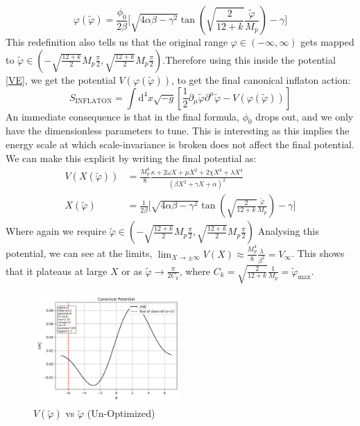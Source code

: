 \documentclass[aps,prd,reprint,preprintnumbers,showpacs,floatfix,nofootinbib,superscript address]{revtex4-2}
\begin{document}
\begin{equation}
    \varphi(\tilde{\varphi}) = \frac{\phi_0}{2\beta} \Biggl[ \sqrt{4\alpha\beta - \gamma^2} \tan\left(\sqrt{\frac{2}{12+k}}\frac{\tilde{\varphi}}{M_p}\right) - \gamma \Biggr] 
\end{equation}
This redefinition also tells us that the original range $\varphi \in (-\infty,\infty)$ gets mapped to $\tilde{\varphi} \in \left( -\sqrt{\frac{12 + k}{2}}M_p \frac{\pi}{2},\sqrt{\frac{12 + k}{2}}M_p \frac{\pi}{2} \right)$.Therefore using this inside the potential \ref{VE}, we get the potential $V(\varphi(\tilde{\varphi}))$, to get the final canonical inflaton action:
\begin{equation}
    S_{\text{INFLATON}} = \int \text{d}^4x \sqrt{-g} \left[ \frac{1}{2}\partial_\mu \tilde{\varphi}\partial^\mu \tilde{\varphi} - V(\varphi(\tilde{\varphi})) \right]
\end{equation}
An immediate consequence is that in the final formula, $\phi_0$ drops out, and we only have the dimensionless parameters to tune. This is interesting as this implies the energy scale at which scale-invariance is broken does not affect the final potential. We can make this explicit by writing the final potential as:
\begin{align}
    V(X(\tilde{\varphi})) &=  \frac{M_p^4}{8}  \frac{ \kappa + 2\omega X +\mu X^2 + 2\chi X^3 + \lambda X^4 }{(\beta X^2 + \gamma X + \alpha )^2} \label{Potential} \\
    X(\tilde{\varphi}) &= \frac{1}{2\beta} \Biggl[ \sqrt{4\alpha\beta - \gamma^2} \tan\left(\sqrt{\frac{2}{12+k}}\frac{\tilde{\varphi}}{M_p}\right) - \gamma \Biggr]  \label{X}
\end{align}
Where again we require $\tilde{\varphi} \in \left( -\sqrt{\frac{12 + k}{2}}M_p \frac{\pi}{2},\sqrt{\frac{12 + k}{2}}M_p \frac{\pi}{2} \right)$
Analysing this potential, we can see at the limits, $\lim_{X \rightarrow \pm \infty} V(X) \approx \frac{M_p^4}{8} \frac{\lambda}{\beta^2} = V_\infty$. This shows that it plateaus at large $X$ or as $\tilde{\varphi} \rightarrow \frac{\pi}{2 C_k}$, where $C_k = \sqrt{\frac{2}{12+k}} \frac{1}{M_p} = \tilde{\varphi}_\text{max}$.

\begin{figure}[h!]
    \centering
    \includegraphics[width=0.5\textwidth]{Python/Figures/AE/inflation_plots/potential.png}
    \caption{$V(\tilde{\varphi})$ vs $\tilde{\varphi}$ (Un-Optimized)}
    \label{Canonical Potential vs Field1}
\end{figure}
\end{document}
